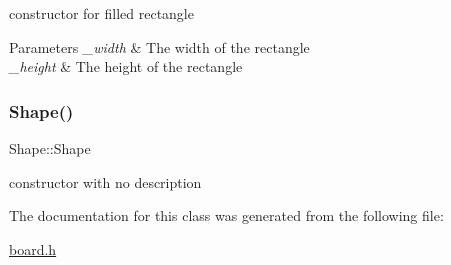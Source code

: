 constructor for filled rectangle 


\begin{DoxyParams}{Parameters}
{\em \+\_\+width} & The width of the rectangle \\
\hline
{\em \+\_\+height} & The height of the rectangle \\
\hline
\end{DoxyParams}
\mbox{\label{class_board_aaa8d87171e65e0d8ba3c5459978992a7}} 
\subsubsection{\texorpdfstring{Shape()}{Shape()}\hspace{0.1cm}{\footnotesize\ttfamily [3/3]}}
{\footnotesize\ttfamily Shape\+::\+Shape\hspace{0.3cm}{\ttfamily [inline]}}



constructor with no description 



The documentation for this class was generated from the following file\+:\begin{DoxyCompactItemize}
\item 
\mbox{\hyperlink{board_8h}{board.\+h}}\end{DoxyCompactItemize}
